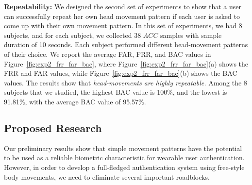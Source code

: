 \vspace{4pt}\textbf{Repeatability:} We designed the second set of experiments to show that a user can successfully repeat her own head movement pattern if each user is asked to come up with their own movement pattern. In this set of experiments, we had 8 subjects, and for each subject, we collected 38 $ACC$ samples with sample duration of 10 seconds. Each subject performed different head-movement patterns of their choice. We report the average FAR, FRR, and BAC values in Figure~\ref{fig:exp2_frr_far_bac}, where Figure~\ref{fig:exp2_frr_far_bac}(a) shows the FRR and FAR values, while Figure~\ref{fig:exp2_frr_far_bac}(b) shows the BAC values. The results show that \emph{head-movements are highly repeatable.} Among the 8 subjects that we studied, the highest BAC value is 100\%, and the lowest is 91.81\%, with the average BAC value of 95.57\%.


\subsection{Proposed Research}
Our preliminary results show that simple movement patterns have the potential to be used as a reliable biometric characteristic for wearable user authentication. However, in order to develop a full-fledged authentication system using free-style body movements, we need to eliminate several important roadblocks.

